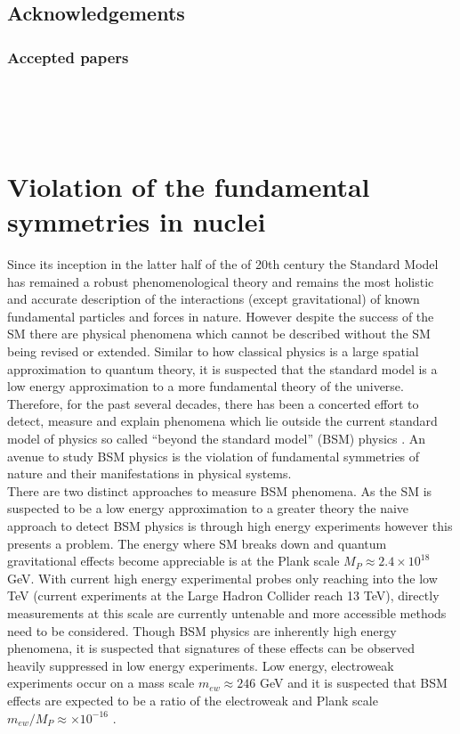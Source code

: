 \documentclass[8pt,a4paper, twoside]{report}
\begin{document}
\chapter*{Acknowledgements}
\thispagestyle{empty}

\clearpage
\section*{Accepted papers}
\cite{LDFDb2018}  \\
\cite{LFWQM2018}  \\
\cite{LDFOg2018}  \\
\cite{LFMQM2018} 
\cite{LDFSg2019} 
\part{Violation of the fundamental symmetries in nuclei}
Since its inception in the latter half of the of 20th century the Standard Model has remained a robust phenomenological theory and remains the most holistic and accurate description of the interactions (except gravitational) of known fundamental particles and forces in nature. However despite the success of the SM \cite{} there are  physical phenomena which cannot be described without the SM being revised or extended. Similar to how classical physics is a large spatial approximation to quantum theory, it is suspected that the standard model is a low energy approximation to a more fundamental theory of the universe.  Therefore, for the past several decades, there has been a concerted effort to detect, measure and explain phenomena which lie outside the current standard model of physics so called ``beyond the standard model'' (BSM) physics . An avenue to study BSM physics is the violation of fundamental symmetries of nature and their manifestations in physical systems.\\
\linebreak
There are two distinct approaches to measure BSM phenomena. As the SM is suspected to be a low energy approximation to a greater theory the naive approach to detect BSM physics is through high energy experiments however this presents a problem. The energy where SM breaks down and quantum gravitational effects become appreciable is at the Plank scale $M_P \approx 2.4 \times 10^{18}$ GeV. With current high energy experimental probes only reaching into the low TeV (current experiments at the Large Hadron Collider reach 13 TeV), directly measurements at this scale are currently untenable and more accessible methods need to be considered. Though BSM physics are inherently high energy phenomena, it is suspected that signatures of these effects can be observed heavily suppressed in low energy experiments. Low energy,  electroweak experiments occur on a mass scale $m_{ew} \approx 246$ GeV \cite{} and it is suspected that BSM effects are expected to be a ratio of the electroweak and Plank scale $m_{ew}/M_P \approx \times 10^{-16}$  \cite{Kostelecky1995}. \\
\end{document}

